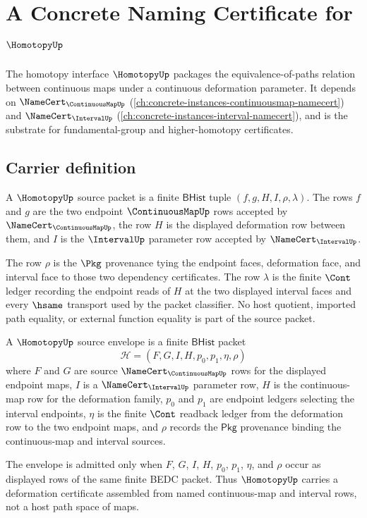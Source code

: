 \chapter{A Concrete Naming Certificate for $\HomotopyUp$}
\label{ch:concrete-instances-homotopy-namecert}

The homotopy interface $\HomotopyUp$ packages the equivalence-of-paths relation between continuous maps under a continuous deformation parameter. It depends on $\NameCert_{\ContinuousMapUp}$ (\autoref{ch:concrete-instances-continuousmap-namecert}) and $\NameCert_{\IntervalUp}$ (\autoref{ch:concrete-instances-interval-namecert}), and is the substrate for fundamental-group and higher-homotopy certificates.

\section{Carrier definition}
\label{sec:homotopy-carrier}

\begin{definition}
\label{def:homotopy-bhist-source-packet}
A $\HomotopyUp$ source packet is a finite $\mathsf{BHist}$ tuple
$(f,g,H,I,\rho,\lambda)$. The rows $f$ and $g$ are the two endpoint
$\ContinuousMapUp$ rows accepted by $\NameCert_{\ContinuousMapUp}$, the row
$H$ is the displayed deformation row between them, and $I$ is the
$\IntervalUp$ parameter row accepted by $\NameCert_{\IntervalUp}$.

The row $\rho$ is the $\Pkg$ provenance tying the endpoint faces, deformation
face, and interval face to those two dependency certificates. The row
$\lambda$ is the finite $\Cont$ ledger recording the endpoint reads of $H$ at
the two displayed interval faces and every $\hsame$ transport used by the
packet classifier. No host quotient, imported path equality, or external
function equality is part of the source packet.
\end{definition}

\begin{definition}
\label{def:homotopy-source-envelope}
A $\HomotopyUp$ source envelope is a finite $\mathsf{BHist}$ packet
$$
\mathcal{H}=(F,G,I,H,p_0,p_1,\eta,\rho)
$$
where $F$ and $G$ are source $\NameCert_{\ContinuousMapUp}$ rows for the displayed endpoint maps, $I$ is a $\NameCert_{\IntervalUp}$ parameter row, $H$ is the continuous-map row for the deformation family, $p_0$ and $p_1$ are endpoint ledgers selecting the interval endpoints, $\eta$ is the finite $\Cont$ readback ledger from the deformation row to the two endpoint maps, and $\rho$ records the $\mathsf{Pkg}$ provenance binding the continuous-map and interval sources.

The envelope is admitted only when $F$, $G$, $I$, $H$, $p_0$, $p_1$, $\eta$, and $\rho$ occur as displayed rows of the same finite BEDC packet. Thus $\HomotopyUp$ carries a deformation certificate assembled from named continuous-map and interval rows, not a host path space of maps.
\end{definition}

